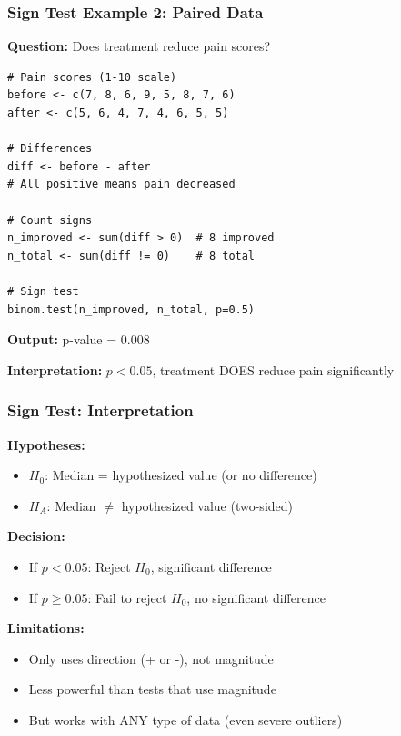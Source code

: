 \documentclass{beamer}
\begin{document}
\begin{frame}[fragile]
\frametitle{Sign Test Example 2: Paired Data}
\textbf{Question:} Does treatment reduce pain scores?

\vspace{0.3cm}
\begin{small}
\begin{verbatim}
# Pain scores (1-10 scale)
before <- c(7, 8, 6, 9, 5, 8, 7, 6)
after <- c(5, 6, 4, 7, 4, 6, 5, 5)

# Differences
diff <- before - after
# All positive means pain decreased

# Count signs
n_improved <- sum(diff > 0)  # 8 improved
n_total <- sum(diff != 0)    # 8 total

# Sign test
binom.test(n_improved, n_total, p=0.5)
\end{verbatim}
\end{small}

\textbf{Output:} p-value = 0.008

\textbf{Interpretation:} $p < 0.05$, treatment DOES reduce pain significantly
\end{frame}

\begin{frame}
\frametitle{Sign Test: Interpretation}
\textbf{Hypotheses:}
\begin{itemize}
\item $H_0$: Median = hypothesized value (or no difference)
\item $H_A$: Median $\neq$ hypothesized value (two-sided)
\end{itemize}

\vspace{0.5cm}
\textbf{Decision:}
\begin{itemize}
\item If $p < 0.05$: Reject $H_0$, significant difference
\item If $p \geq 0.05$: Fail to reject $H_0$, no significant difference
\end{itemize}

\vspace{0.5cm}
\textbf{Limitations:}
\begin{itemize}
\item Only uses direction (+ or -), not magnitude
\item Less powerful than tests that use magnitude
\item But works with ANY type of data (even severe outliers)
\end{itemize}
\end{frame}
\end{document}
